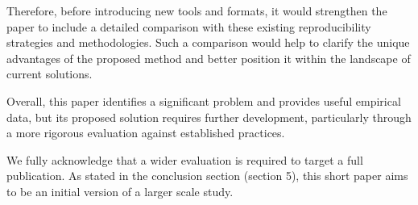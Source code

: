 \documentclass[%
	11pt,
	final,
]{article}
\begin{document}
Therefore, before introducing new tools and formats, it would strengthen the paper to include a detailed comparison with these existing reproducibility strategies and methodologies.
Such a comparison would help to clarify the unique advantages of the proposed method and better position it within the landscape of current solutions.

Overall, this paper identifies a significant problem and provides useful empirical data, but its proposed solution requires further development, particularly through a more rigorous evaluation against established practices.

\begin{review-answer}
  We fully acknowledge that a wider evaluation is required to target a full publication.
  As stated in the conclusion section (section 5), this short paper aims to be an initial version of a larger scale study.
\end{review-answer}
\end{document}
